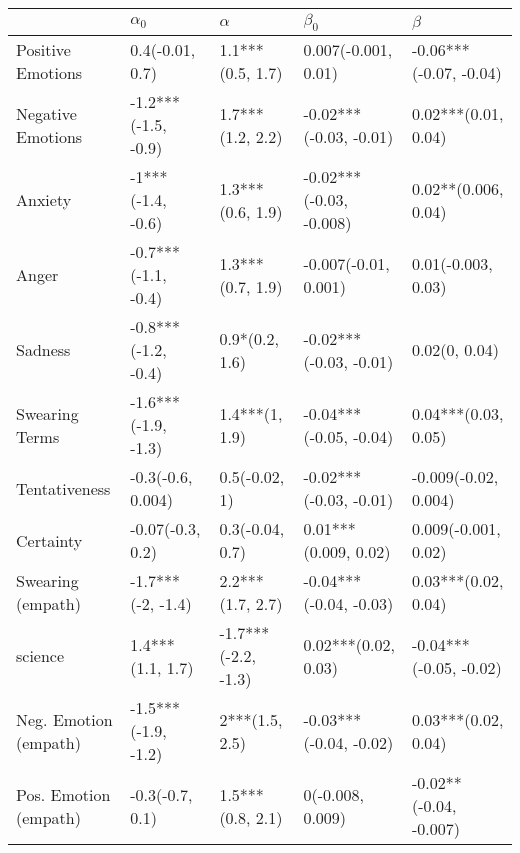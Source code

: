 \begin{tabular}{lllll}
\toprule
{} &           $\alpha_0$ &             $\alpha$ &                $\beta_0$ &                 $\beta$ \\
\midrule
Positive Emotions     &      0.4(-0.01, 0.7) &     1.1***(0.5, 1.7) &      0.007(-0.001, 0.01) &  -0.06***(-0.07, -0.04) \\
Negative Emotions     &  -1.2***(-1.5, -0.9) &     1.7***(1.2, 2.2) &   -0.02***(-0.03, -0.01) &     0.02***(0.01, 0.04) \\
Anxiety               &    -1***(-1.4, -0.6) &     1.3***(0.6, 1.9) &  -0.02***(-0.03, -0.008) &     0.02**(0.006, 0.04) \\
Anger                 &  -0.7***(-1.1, -0.4) &     1.3***(0.7, 1.9) &     -0.007(-0.01, 0.001) &      0.01(-0.003, 0.03) \\
Sadness               &  -0.8***(-1.2, -0.4) &       0.9*(0.2, 1.6) &   -0.02***(-0.03, -0.01) &           0.02(0, 0.04) \\
Swearing Terms        &  -1.6***(-1.9, -1.3) &       1.4***(1, 1.9) &   -0.04***(-0.05, -0.04) &     0.04***(0.03, 0.05) \\
Tentativeness         &    -0.3(-0.6, 0.004) &        0.5(-0.02, 1) &   -0.02***(-0.03, -0.01) &    -0.009(-0.02, 0.004) \\
Certainty             &     -0.07(-0.3, 0.2) &      0.3(-0.04, 0.7) &     0.01***(0.009, 0.02) &     0.009(-0.001, 0.02) \\
Swearing (empath)     &    -1.7***(-2, -1.4) &     2.2***(1.7, 2.7) &   -0.04***(-0.04, -0.03) &     0.03***(0.02, 0.04) \\
science               &     1.4***(1.1, 1.7) &  -1.7***(-2.2, -1.3) &      0.02***(0.02, 0.03) &  -0.04***(-0.05, -0.02) \\
Neg. Emotion (empath) &  -1.5***(-1.9, -1.2) &       2***(1.5, 2.5) &   -0.03***(-0.04, -0.02) &     0.03***(0.02, 0.04) \\
Pos. Emotion (empath) &      -0.3(-0.7, 0.1) &     1.5***(0.8, 2.1) &         0(-0.008, 0.009) &  -0.02**(-0.04, -0.007) \\
\bottomrule
\end{tabular}
